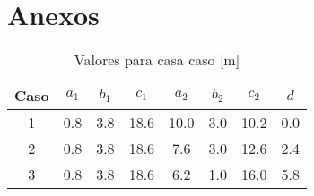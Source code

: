 \section*{Anexos}

\begin{table}[H]
    \centering
    \begin{tabular}{|c|c|c|c|c|c|c|c|}
    \hline
    Caso & $a_1$ & $b_1$ & $c_1$ & $a_2$ & $b_2$ & $c_2$ & $d$ \\ \hline
    1    & 0.8   & 3.8   & 18.6  & 10.0  & 3.0   & 10.2  & 0.0 \\ \hline
    2    & 0.8   & 3.8   & 18.6  & 7.6   & 3.0   & 12.6  & 2.4  \\ \hline
    3    & 0.8   & 3.8   & 18.6  & 6.2   & 1.0   & 16.0  & 5.8  \\ \hline
    \end{tabular}
    \caption{Valores para casa caso [m]}
    \label{tab:medidas}
\end{table}
    